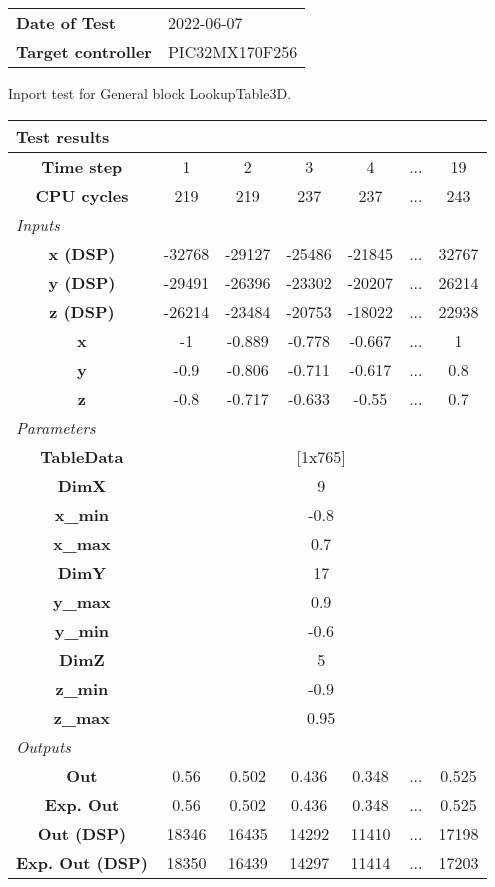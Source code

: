 \begin{tabular}{l l}
\textbf{Date of Test} & 2022-06-07 \tabularnewline
\textbf{Target controller} & PIC32MX170F256 \tabularnewline
\end{tabular}
\vspace{1ex}
Inport test for General block LookupTable3D.

\vspace{1em}
\begin{tabularx}{\textwidth}{|c|c|c|c|c|>{\centering\arraybackslash}X|c|}
\hline
\multicolumn{7}{|l|}{\cellcolor[gray]{0.8}\textbf{Test results}} \tabularnewline \hline
\textbf{Time step} & 1 & 2 & 3 & 4 & ... & 19 \tabularnewline \hline
\textbf{CPU cycles} & 219 & 219 & 237 & 237 & ... & 243 \tabularnewline \hline
\multicolumn{7}{|l|}{\cellcolor[gray]{0.9}\textit{Inputs}} \tabularnewline \hline
\textbf{x (DSP)} & -32768 & -29127 & -25486 & -21845 & ... & 32767 \tabularnewline \hline
\textbf{y (DSP)} & -29491 & -26396 & -23302 & -20207 & ... & 26214 \tabularnewline \hline
\textbf{z (DSP)} & -26214 & -23484 & -20753 & -18022 & ... & 22938 \tabularnewline \hline
\textbf{x} & -1 & -0.889 & -0.778 & -0.667 & ... & 1 \tabularnewline \hline
\textbf{y} & -0.9 & -0.806 & -0.711 & -0.617 & ... & 0.8 \tabularnewline \hline
\textbf{z} & -0.8 & -0.717 & -0.633 & -0.55 & ... & 0.7 \tabularnewline \hline
\multicolumn{7}{|l|}{\cellcolor[gray]{0.9}\textit{Parameters}} \tabularnewline \hline
\textbf{TableData} & \multicolumn{6}{c|}{[1x765]} \tabularnewline \hline
\textbf{DimX} & \multicolumn{6}{c|}{9} \tabularnewline \hline
\textbf{x\_min} & \multicolumn{6}{c|}{-0.8} \tabularnewline \hline
\textbf{x\_max} & \multicolumn{6}{c|}{0.7} \tabularnewline \hline
\textbf{DimY} & \multicolumn{6}{c|}{17} \tabularnewline \hline
\textbf{y\_max} & \multicolumn{6}{c|}{0.9} \tabularnewline \hline
\textbf{y\_min} & \multicolumn{6}{c|}{-0.6} \tabularnewline \hline
\textbf{DimZ} & \multicolumn{6}{c|}{5} \tabularnewline \hline
\textbf{z\_min} & \multicolumn{6}{c|}{-0.9} \tabularnewline \hline
\textbf{z\_max} & \multicolumn{6}{c|}{0.95} \tabularnewline \hline
\multicolumn{7}{|l|}{\cellcolor[gray]{0.9}\textit{Outputs}} \tabularnewline \hline
\textbf{Out} & 0.56 & 0.502 & 0.436 & 0.348 & ... & 0.525 \tabularnewline \hline
\textbf{Exp. Out} & 0.56 & 0.502 & 0.436 & 0.348 & ... & 0.525 \tabularnewline \hline
\textbf{Out (DSP)} & 18346 & 16435 & 14292 & 11410 & ... & 17198 \tabularnewline \hline
\textbf{Exp. Out (DSP)} & 18350 & 16439 & 14297 & 11414 & ... & 17203 \tabularnewline \hline
\end{tabularx}
\vspace{1ex}

